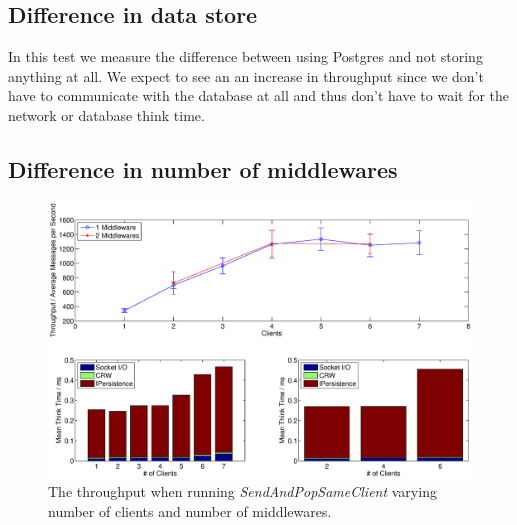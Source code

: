 \documentclass{article}
\begin{document}
        \subsection{Difference in data store}
            In this test we measure the difference between using Postgres and not storing anything at all. We expect to see an an increase in throughput since we don't have to communicate with the database at all and thus don't have to wait for the network or database think time.
            
        \subsection{Difference in number of middlewares}
            \begin{figure}[H]
                \hspace{-1.5cm}
                \includegraphics[scale=0.40]{throughout-thinktime_middleware_clients}
                \caption{The throughput when running \textit{SendAndPopSameClient} varying number of clients and number of middlewares.}
                \label{fig:throughput_middleware_clients}
                \end{figure}
\end{document}
